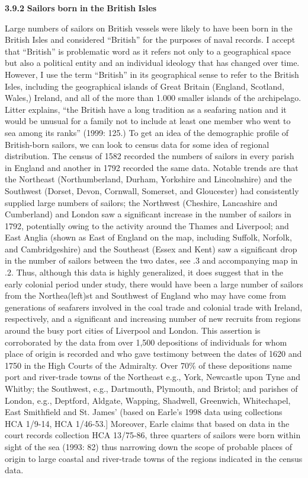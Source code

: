 \begin{styleNormali}
\textbf{3.9.2} \textbf{Sailors} \textbf{born} \textbf{in} \textbf{the} \textbf{British} \textbf{Isles} 
\end{styleNormali}

Large numbers of sailors on British vessels were likely to have been born in the British Isles and considered “British” for the purposes of naval records. I accept that “British” is problematic word as it refers not only to a geographical space but also a political entity and an individual ideology that has changed over time. However, I use the term “British” in its geographical sense to refer to the British Isles, including the geographical islands of Great Britain (England, Scotland, Wales,) Ireland, and all of the more than 1.000 smaller islands of the archipelago. Litter explains, “the British have a long tradition as a seafaring nation and it would be unusual for a family not to include at least one member who went to sea among its ranks” (1999: 125.) To get an idea of the demographic profile of British-born sailors, we can look to census data for some idea of regional distribution. The census of 1582 recorded the numbers of sailors in every parish in England \citep[246]{Bicheno2012} and another in 1792 recorded the same data. Notable trends are that the Northeast (Northumberland, Durham, Yorkshire and Lincolnshire) and the Southwest (Dorset, Devon, Cornwall, Somerset, and Gloucester) had consistently supplied large numbers of sailors; the Northwest (Cheshire, Lancashire and Cumberland) and London saw a significant increase in the number of sailors in 1792, potentially owing to the activity around the Thames and Liverpool; and East Anglia (shown as East of England on the map, including Suffolk, Norfolk, and Cambridgeshire) and the Southeast (Essex and Kent) saw a significant drop in the number of sailors between the two dates, see .3 and accompanying map in .2. Thus, although this data is highly generalized, it does suggest that in the early colonial period under study, there would have been a large number of sailors from the Northea(left)st and Southwest of England who may have come from generations of seafarers involved in the coal trade and colonial trade with Ireland, respectively, and a significant and increasing number of new recruits from regions around the busy port cities of Liverpool and London. This assertion is corroborated by the data from over 1,500 depositions of individuals for whom place of origin is recorded and who gave testimony between the dates of 1620 and 1750 in the High Courts of the Admiralty. Over 70\% of these depositions name port and river-trade towns of the Northeast e.g., York, Newcastle upon Tyne and Whitby; the Southwest, e.g., Dartmouth, Plymouth, and Bristol; and parishes of London, e.g., Deptford, Aldgate, Wapping, Shadwell, Greenwich, Whitechapel, East Smithfield and St. James’ (based on Earle’s 1998 data using collections HCA 1/9-14, HCA 1/46-53.] Moreover, Earle claims that based on data in the court records collection HCA 13/75-86, three quarters of sailors were born within sight of the sea (1993: 82) thus narrowing down the scope of probable places of origin to large coastal and river-trade towns of the regions indicated in the census data. 

